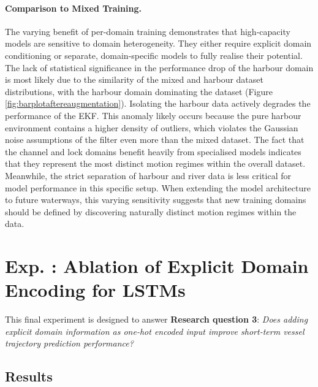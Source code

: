 \paragraph{Comparison to Mixed Training.}
The varying benefit of per-domain training demonstrates that high-capacity models are sensitive to domain heterogeneity.
They either require explicit domain conditioning or separate, domain-specific models to fully realise their potential.
The lack of statistical significance in the performance drop of the harbour domain is most likely due to the similarity of the mixed and harbour dataset distributions, with the harbour domain dominating the dataset (Figure \ref{fig:barplotaftereaugmentation}). 
Isolating the harbour data actively degrades the performance of the \ac{EKF}.
This anomaly likely occurs because the pure harbour environment contains a higher density of %
outliers, which violates the Gaussian noise assumptions of the filter even more %
than the mixed dataset. %
The fact that the channel and lock domains benefit heavily from specialised models indicates that they represent the most distinct motion regimes within the overall dataset.
Meanwhile, the strict separation of harbour and river data is less critical for model performance in this specific setup.
When extending the model architecture to future waterways, this varying sensitivity suggests that new training domains should be defined by discovering naturally distinct motion regimes within the data.






\section[Exp. \Romannum{3}: LSTM Domain Encoding]{Exp. : Ablation of Explicit Domain Encoding for LSTMs}
\label{sec:exp3}

This final experiment is designed to answer \textbf{Research question 3}: \textit{Does adding explicit domain information as one-hot encoded input improve short-term
vessel trajectory prediction performance?}
\subsection{Results}

